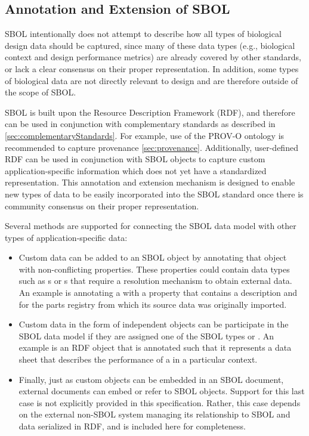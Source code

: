 \subsection{Annotation and Extension of SBOL}
\label{sec:Annotations}

SBOL intentionally does not attempt to describe how all types of biological design data should be captured, since many of these data types (e.g., biological context and design performance metrics) are already covered by other standards, or lack a clear consensus on their proper representation. In addition, some types of biological data are not directly relevant to design and are therefore outside of the scope of SBOL.

SBOL is built upon the Resource Description Framework (RDF), and therefore can be used in conjunction with complementary standards as described in \autoref{sec:complementaryStandards}.  For example, use of the PROV-O ontology is recommended to capture provenance \autoref{sec:provenance}.  Additionally, user-defined RDF can be used in conjunction with SBOL objects to capture custom application-specific information which does not yet have a standardized representation.  This annotation and extension mechanism is designed to enable new types of data to be easily incorporated into the SBOL standard once there is community consensus on their proper representation.

Several methods are supported for connecting the SBOL data model with other types of application-specific data:

\begin{itemize}
\item Custom data can be added to an SBOL object by annotating that object with non-conflicting properties. These properties could contain  data types such as s or s that require a resolution mechanism to obtain external data. An example is annotating a  with  a property that contains a  description and  for the parts registry from which its source data was originally imported.
\item Custom data in the form of independent objects can be participate in the SBOL data model if they are assigned one of the SBOL types  or .  An example is an RDF object that is annotated such that it represents a data sheet that describes the performance of a  in a particular context.
\item Finally, just as custom objects can be embedded in an  SBOL document, external documents can embed or refer to SBOL objects. Support for this last case is not explicitly provided in this specification. Rather, this case depends on the external non-SBOL system managing its relationship to SBOL and data serialized in RDF, and is included here for completeness.
\end{itemize}

